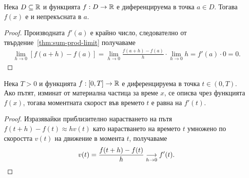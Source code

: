 \documentclass[numbers=endperiod, bibliography=totocnumbered]{scrartcl}
\begin{document}
\begin{proposition}
  Нека \( D \subseteq \R \) и функцията \( f: D \to \R \) е диференцируема в точка \( a \in D \). Тогава \( f(x) \) е и непрекъсната в \( a \).
\end{proposition}
\begin{proof}
  Производната \( f'(a) \) е крайно число, следователно от твърдение~\ref{thm:sum-prod-limit} получаваме
  \begin{align*}
    \lim_{h \to 0} [f(a+h) - f(a)]
    =
    \lim_{h \to 0} \frac {f(a+h) - f(a)} h \cdot \lim_{h \to 0} h
    =
    f'(a) \cdot 0
    =
    0.
  \end{align*}
\end{proof}

\begin{theorem}
  Нека \( T > 0 \) и функцията \( f: [0, T] \to \R \) е диференцируема в точка \( t \in (0, T) \). Ако пътят, изминат от материална частица за време \( x \), се описва чрез функцията \( f(x) \), тогава моментната скорост във времето \( t \) е равна на \( f'(t) \).
\end{theorem}
\begin{proof}
  Изразявайки приблизително нарастването на пътя \( f(t+h) - f(t) \approx h v(t) \) като нарастването на времето \( t \) умножено по скоростта \( v(t) \) на движение в момента \( t \), получаваме
  \begin{align*}
    v(t) = \frac{f(t+h) - f(t)} {h} \Conv[h \to 0]{} f'(t).
  \end{align*}
\end{proof}
\end{document}
